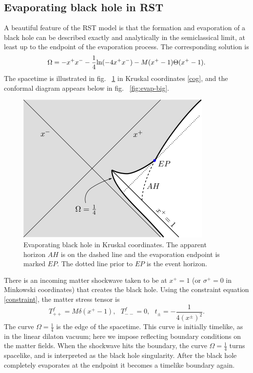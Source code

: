 \documentclass[12pt,oneside,letterpaper]{article}
\newcommand{\be}{\begin{equation}}
\newcommand{\ee}{\end{equation}}
\def\be{\begin{eqnarray}}
\def\ee{\end{eqnarray}}
\def\be{\begin{equation}}
\def\ee{\end{equation}}
\def\m{{M}}
\def\log{{\rm ln}}
\numberwithin{equation}{section}
\def \be {\begin{equation}}
\def \ee {\end{equation}}
\begin{document}
\subsection{Evaporating black hole in RST}
A beautiful feature of the RST model is that the  formation and evaporation of a black hole can be described exactly and analytically in the semiclassical limit, at least up to the endpoint of the evaporation process. The corresponding solution is
\be\label{omegaevap}
\Omega = - x^+ x^- - \frac{1}{4}\log(-4 x^+ x^-) - \m(x^+ - 1) \Theta(x^+ -1 ) .
\ee
The spacetime is illustrated in fig. ~\ref{fig:evapX} in Kruskal coordinates \eqref{cog}, and the conformal diagram appears below in fig. ~\ref{fig:evap-big}.
\begin{figure}
\begin{center}
\includegraphics[scale=1.0]{figures/evapX.png}
\end{center}
\caption{\small Evaporating black hole in Kruskal coordinates. The apparent horizon $AH$ is on the dashed line and the evaporation endpoint is marked $EP$. The dotted line prior to $EP$ is the event horizon. \label{fig:evapX}}
\end{figure}
There is an incoming matter shockwave taken to be at $x^+ = 1$ (or $\sigma^+=0$ in Minkowski coordinates) that creates the black hole. Using the constraint equation \eqref{constraint}, the matter stress tensor is 
\be T^f_{++}=\m \delta(x^+ - 1), ~~~T^f_{--}=0, ~~~t_\pm = -\frac{1}{4(x^\pm)^2}.\ee
The curve $\Omega = \frac{1}{4}$ is the edge of the spacetime. This curve is initially timelike, as in the linear dilaton vacuum; here we impose reflecting boundary conditions on the matter fields. When the shockwave hits the boundary, the curve $\Omega = \frac{1}{4}$ turns spacelike, and is interpreted as the black hole singularity.  After the black hole completely evaporates at the endpoint it becomes a timelike boundary again. 
\end{document}
